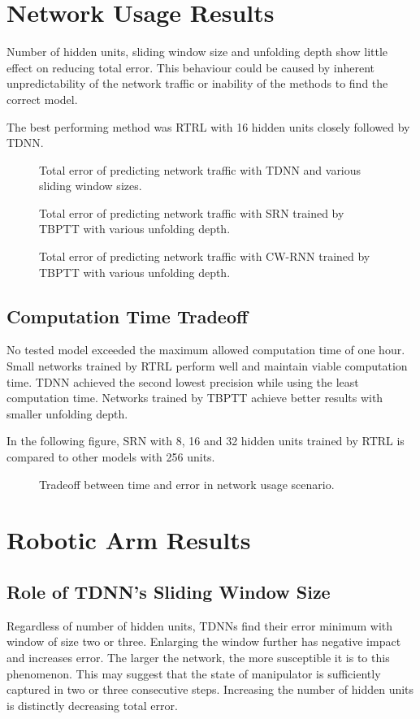 \documentclass[12pt,oneside]{fithesis2}
\begin{document}
\section{Network Usage Results}
Number of hidden units, sliding window size and unfolding depth show little effect on reducing total error. This behaviour could be caused by inherent unpredictability of the network traffic or inability of the methods to find the correct model.\par
The best performing method was RTRL with 16 hidden units closely followed by TDNN.

	\begin{figure}[H]
		\caption{Total error of predicting network traffic with TDNN and various sliding window sizes.}
		

		\caption{Total error of predicting network traffic with SRN trained by TBPTT with various unfolding depth.}
		

		\caption{Total error of predicting network traffic with CW-RNN trained by TBPTT with various unfolding depth.}
		
	\end{figure}

\subsection{Computation Time Tradeoff}
No tested model exceeded the maximum allowed computation time of one hour. Small networks trained by RTRL perform well and maintain viable computation time. TDNN achieved the second lowest precision while using the least computation time. Networks trained by TBPTT achieve better results with smaller unfolding depth.\par
In the following figure, SRN with 8, 16 and 32 hidden units trained by RTRL is compared to other models with 256 units.
	\begin{figure}[H]
		\caption{Tradeoff between time and error in network usage scenario.}
		
	\end{figure}
	
\section{Robotic Arm Results}
\subsection{Role of TDNN's Sliding Window Size}
Regardless of number of hidden units, TDNNs find their error minimum with window of size two or three. Enlarging the  window further has negative impact and increases error. The larger the network, the more susceptible it is to this phenomenon. This may suggest that the state of manipulator is sufficiently captured in two or three consecutive steps. Increasing the number of hidden units is distinctly decreasing total error.
\end{document}
